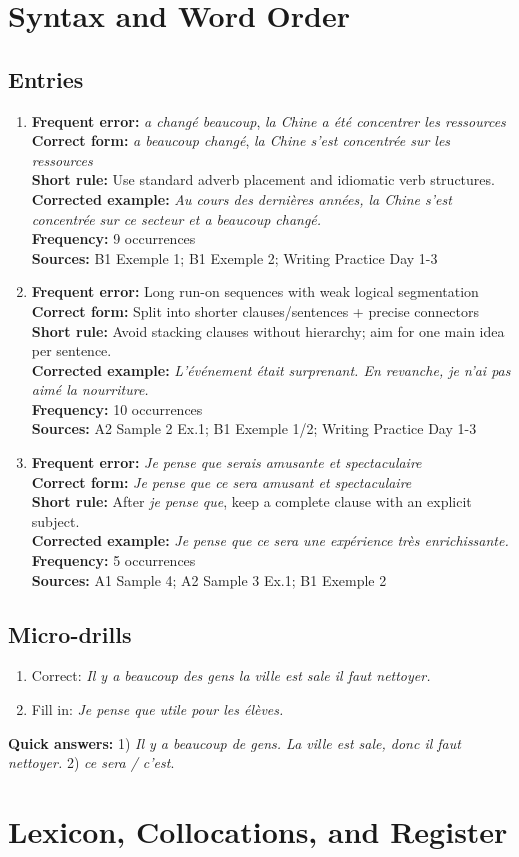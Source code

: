 \documentclass{article}
\newcommand{\mistakeentry}[6]{
\item \textbf{Frequent error:} #1\\
\textbf{Correct form:} #2\\
\textbf{Short rule:} #3\\
\textbf{Corrected example:} #4\\
\textbf{Frequency:} #5\\
\textbf{Sources:} #6
}
\begin{document}
\section{Syntax and Word Order}
\subsection*{Entries}
\begin{enumerate}
    \mistakeentry
    {\textit{a changé beaucoup}, \textit{la Chine a été concentrer les ressources}}
    {\textit{a beaucoup changé}, \textit{la Chine s'est concentrée sur les ressources}}
    {Use standard adverb placement and idiomatic verb structures.}
    {\textit{Au cours des dernières années, la Chine s'est concentrée sur ce secteur et a beaucoup changé.}}
    {9 occurrences}
    {B1 Exemple 1; B1 Exemple 2; Writing Practice Day 1-3}

    \mistakeentry
    {Long run-on sequences with weak logical segmentation}
    {Split into shorter clauses/sentences + precise connectors}
    {Avoid stacking clauses without hierarchy; aim for one main idea per sentence.}
    {\textit{L'événement était surprenant. En revanche, je n'ai pas aimé la nourriture.}}
    {10 occurrences}
    {A2 Sample 2 Ex.1; B1 Exemple 1/2; Writing Practice Day 1-3}

    \mistakeentry
    {\textit{Je pense que serais amusante et spectaculaire}}
    {\textit{Je pense que ce sera amusant et spectaculaire}}
    {After \textit{je pense que}, keep a complete clause with an explicit subject.}
    {\textit{Je pense que ce sera une expérience très enrichissante.}}
    {5 occurrences}
    {A1 Sample 4; A2 Sample 3 Ex.1; B1 Exemple 2}
\end{enumerate}

\subsection*{Micro-drills}
\begin{enumerate}
    \item Correct: \textit{Il y a beaucoup des gens la ville est sale il faut nettoyer.}
    \item Fill in: \textit{Je pense que \underline{\hspace{2cm}} utile pour les élèves.}
\end{enumerate}
\textbf{Quick answers:} 1) \textit{Il y a beaucoup de gens. La ville est sale, donc il faut nettoyer.} 2) \textit{ce sera / c'est}.

\section{Lexicon, Collocations, and Register}
\end{document}
